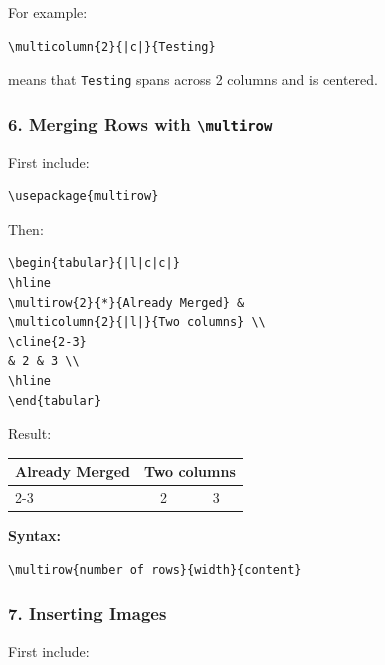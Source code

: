 \documentclass[a4paper,10pt]{article}
\begin{document}
For example:

\begin{verbatim}
\multicolumn{2}{|c|}{Testing}
\end{verbatim}

means that \texttt{Testing} spans across 2 columns and is centered.


\subsubsection{6. Merging Rows with \texttt{\textbackslash multirow}}

First include:

\begin{verbatim}
\usepackage{multirow}
\end{verbatim}

Then:

\begin{verbatim}
\begin{tabular}{|l|c|c|}
\hline
\multirow{2}{*}{Already Merged} &
\multicolumn{2}{|l|}{Two columns} \\
\cline{2-3}
& 2 & 3 \\
\hline
\end{tabular}
\end{verbatim}

Result:

\begin{center}
\begin{tabular}{|l|c|c|}
\hline
\multirow{2}{*}{Already Merged} &
\multicolumn{2}{|l|}{Two columns} \\
\cline{2-3}
& 2 & 3 \\
\hline
\end{tabular}
\end{center}

\textbf{Syntax:}

\begin{verbatim}
\multirow{number of rows}{width}{content}
\end{verbatim}


\subsubsection{7. Inserting Images}

First include:
\end{document}
